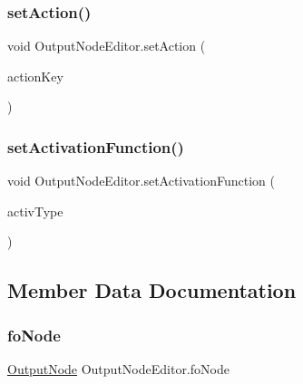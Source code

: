 \mbox{\label{class_output_node_editor_a04ec0f0500518d70391de298bcb07513}} 
\subsubsection{\texorpdfstring{set\+Action()}{setAction()}}
{\footnotesize\ttfamily void Output\+Node\+Editor.\+set\+Action (\begin{DoxyParamCaption}\item[{string}]{action\+Key }\end{DoxyParamCaption})}

\mbox{\label{class_output_node_editor_a832616727e8d1ab1a1a5e8c8d793ac0d}} 
\subsubsection{\texorpdfstring{set\+Activation\+Function()}{setActivationFunction()}}
{\footnotesize\ttfamily void Output\+Node\+Editor.\+set\+Activation\+Function (\begin{DoxyParamCaption}\item[{\mbox{\hyperlink{_non_input_node_8cs_a832a6943e91e304dea9608c4ae2818e7}{Activation\+Behavior\+Types}}}]{activ\+Type }\end{DoxyParamCaption})}



\subsection{Member Data Documentation}
\mbox{\label{class_output_node_editor_a78bb1baa0dddf7eb38ac12357ddea2f6}} 
\subsubsection{\texorpdfstring{fo\+Node}{foNode}}
{\footnotesize\ttfamily \mbox{\hyperlink{class_output_node}{Output\+Node}} Output\+Node\+Editor.\+fo\+Node}

